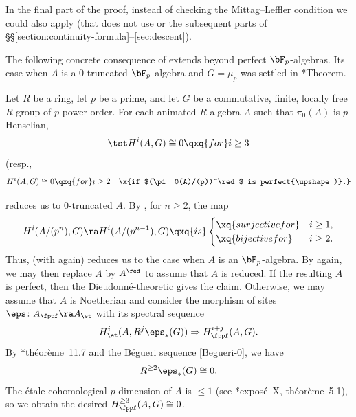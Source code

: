 \brem
In the final part of the proof, instead of checking the Mittag--Leffler condition we could also apply  (that does not use  or the subsequent parts of \S\S\ref{section:continuity-formula}--\ref{sec:descent}).
\erem




The following concrete consequence of  extends  beyond perfect $\bF_p$-algebras. Its case when $A$ is a $0$-truncated $\bF_p$-algebra and $G = \mu_{p}$ was settled in \cite{Tre80}*{Theorem}.

\bcor \label{no-higher-coho}
Let $R$ be a ring, let $p$ be a prime, and let $G$ be a commutative, finite, locally free $R$-group of $p$-power order. For each animated $R$-algebra $A$ such that $\pi_0(A)$ is $p$-Henselian,
\[
\tst H^i(A, G) \cong 0 \qxq{for} i \ge 3
\]
{\upshape(}resp.,
\[
H^i(A, G) \cong 0 \qxq{for} i \ge 2 \quad \x{if $(\pi_0(A)/(p))^\red$ is perfect{\upshape)}.}
\]
\ecor

\bpf
{} reduces us to $0$-truncated $A$. By , %
for $n \ge 2$, the map
\[
H^i(A/(p^n), G) \ra H^i(A/(p^{n - 1}), G) \qxq{is} \begin{cases}\xq{surjective for} &i \ge 1, \\  \xq{bijective for} &i \ge 2. \end{cases}
\]
Thus,	  (with  again) reduces us to the case when $A$ is an $\bF_p$-algebra. By  again,
 we may then replace $A$ by $A^\red$ to assume that $A$ is reduced. If the resulting $A$ is perfect, then the Dieudonn\'{e}-theoretic  gives the claim. Otherwise, we may assume that $A$ is Noetherian and consider the morphism of sites $\eps\colon A_\fppf \ra A_\et$ with its spectral sequence
\[
H^i_\et(A, R^j\eps_*(G)) \Rightarrow H^{i +j}_\fppf(A, G).
\]
By \cite{Gro68c}*{th\'{e}or\`{e}me~11.7} and the B\'{e}gueri sequence \eqref{Begueri-0}, we have
\[
R^{\ge 2}\eps_*(G) \cong 0.
\] %
The \'{e}tale cohomological $p$-dimension of $A$ is $\le 1$ (see \cite{SGA4III}*{expos\'{e}~X, th\'{e}or\`{e}me~5.1}), so we obtain the desired $H^{\ge 3}_\fppf(A, G) \cong 0$.
\epf





